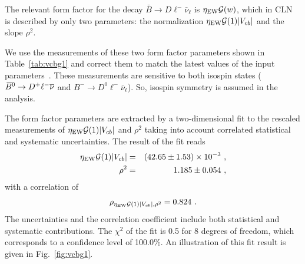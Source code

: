 \label{slbdecays_dlnu}

The relevant form factor for the decay $\bar B\to D\ell^-\bar\nu_\ell$
is $\eta_\mathrm{EW}{\cal G}(w)$, which in CLN~\cite{CLN} is described
by only two parameters: the normalization $\eta_\mathrm{EW}{\cal
  G}(1)|V_{cb}|$ and the slope $\rho^2$.

We use the measurements of these two form factor parameters shown in
Table~\ref{tab:vcbg1} and correct them to match the latest values of
the input parameters~\cite{HFAG_sl:inputparams}. These measurements
are sensitive to both isospin states ($\kern 0.18em\overline{\kern -0.18em B}{}^0 \to D^{+}\ell^{-}\overline{\nu}$ and $B^-\to
D^0\ell^-\bar\nu_\ell$). So, isospin symmetry is assumed in the analysis.


The form factor parameters are extracted by a two-dimensional fit to
the rescaled measurements of $\eta_\mathrm{EW}{\cal G}(1)|V_{cb}|$ and
$\rho^2$ taking into account correlated statistical and systematic
uncertainties. The result of the fit reads
\begin{eqnarray}
  \eta_\mathrm{EW}{\cal G}(1)|V_{cb}| & = & (42.65\pm 1.53)\times
  10^{-3}~, \label{eq:vcbg1} \\
  \rho^2 & = & 1.185 \pm 0.054~,
\end{eqnarray}
with a correlation of
\begin{equation}
  \rho_{\eta_\mathrm{EW}{\cal G}(1)|V_{cb}|,\rho^2} = 0.824~.
\end{equation}
The uncertainties and the correlation coefficient include both
statistical and systematic contributions. The $\chi^2$ of the fit is
0.5 for 8 degrees of freedom, which corresponds to a confidence
level of 100.0\%. An illustration of this fit result is given in
Fig.~\ref{fig:vcbg1}.
